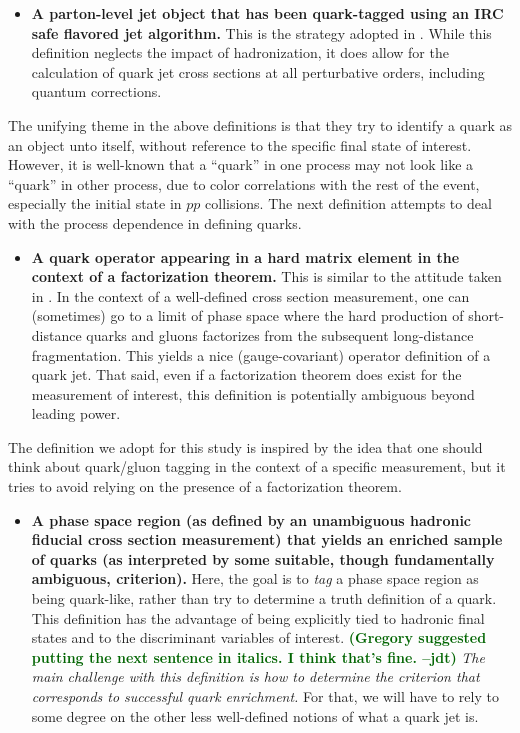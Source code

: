 \documentclass[11pt]{cernrep}
\newcommand{\jdt}[1]{\textbf{\textcolor{darkgreen}{(#1 --jdt)}}}
\begin{document}
\begin{itemize}
\item \textbf{A parton-level jet object that has been quark-tagged using an IRC safe flavored jet algorithm.}  This is the strategy adopted in \cite{Banfi:2006hf}.  While this definition neglects the impact of hadronization, it does allow for the calculation of quark jet cross sections at all perturbative orders, including quantum corrections.
\end{itemize}
The unifying theme in the above definitions is that they try to identify a quark as an object unto itself, without reference to the specific final state of interest.  However, it is well-known that a ``quark'' in one process may not look like a ``quark'' in other process, due to color correlations with the rest of the event, especially the initial state in $pp$ collisions.  The next definition attempts to deal with the process dependence in defining quarks. 
\begin{itemize}
\item \textbf{A quark operator appearing in a hard matrix element in the context of a factorization theorem.}  This is similar to the attitude taken in \cite{Gallicchio:2011xc}.  In the context of a well-defined cross section measurement, one can (sometimes) go to a limit of phase space where the hard production of short-distance quarks and gluons factorizes from the subsequent long-distance fragmentation.  This yields a nice (gauge-covariant) operator definition of a quark jet.  That said, even if a factorization theorem does exist for the measurement of interest, this definition is potentially ambiguous beyond leading power.
\end{itemize}
The definition we adopt for this study is inspired by the idea that one should think about quark/gluon tagging in the context of a specific measurement, but it tries to avoid relying on the presence of a factorization theorem.
\begin{itemize}
\item \textbf{A phase space region (as defined by an unambiguous
    hadronic fiducial cross section measurement) that yields an
    enriched sample of quarks (as interpreted by some suitable, though
    fundamentally ambiguous, criterion).}  Here, the goal is to
  \emph{tag} a phase space region as being quark-like, rather than try
  to determine a truth definition of a quark.  This definition has the
  advantage of being explicitly tied to hadronic final states and to
  the discriminant variables of interest.  \jdt{Gregory suggested putting the next sentence in italics.  I think that's fine.}  \emph{The main
  challenge with this definition is how to determine the criterion
  that corresponds to successful quark enrichment.}  For that, we will
  have to rely to some degree on the other less well-defined notions
  of what a quark jet is.
\end{itemize}
\end{document}
